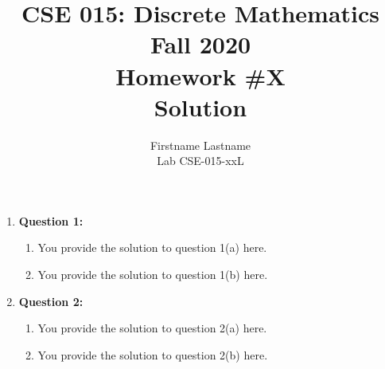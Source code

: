 \documentclass[11pt]{article}
\begin{document}
\author{Firstname Lastname\\
Lab CSE-015-xxL }

\title{CSE 015: Discrete Mathematics\\
Fall 2020\\
Homework \#X\\
Solution}

\maketitle

\begin{enumerate}

\item
\textbf{Question 1:}

\begin{enumerate}[label=(\alph*)]
\item
You provide the solution to question 1(a) here.

\item
You provide the solution to question 1(b) here.

\end{enumerate}

\item
\textbf{Question 2:}

\begin{enumerate}[label=(\alph*)]
\item
You provide the solution to question 2(a) here.

\item
You provide the solution to question 2(b) here.

\end{enumerate}

\end{enumerate}
\end{document}
